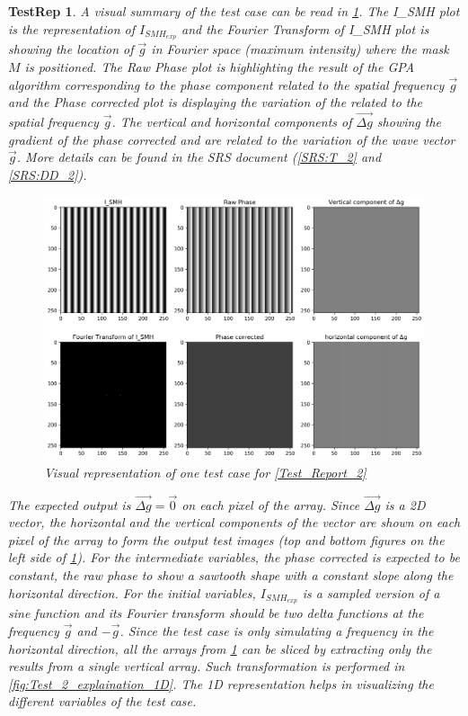 \documentclass[12pt, titlepage]{article}
\newtheorem{TestRep}{TestRep}
\begin{document}
\begin{TestRep}
A visual summary of the test case can be read in \cref{fig:Test_2_explanation}. 
The I{\_}SMH plot is the representation of $I_{SMH_{exp}}$ and the Fourier 
Transform of I{\_}SMH plot is showing the location of $\overrightarrow{g}$ in 
Fourier space (maximum intensity) where the mask $M$ is positioned. The Raw 
Phase plot is highlighting the result of the GPA algorithm corresponding to the 
phase component related to the spatial frequency $\overrightarrow{g}$ and the 
Phase corrected plot is displaying the variation of the related to the spatial 
frequency $\overrightarrow{g}$. The vertical and horizontal components of 
$\overrightarrow{\Delta g}$ showing the gradient of the phase corrected and are 
related to the variation of the wave vector $\overrightarrow{g}$. More details 
can be found in the SRS document (\cref{SRS:T_2} and \cref{SRS:DD_2}).

\begin{figure}[H]
\begin{center}
\includegraphics[scale=0.5]{Figures/Test_2_explanation.png}
\caption{Visual representation of one test case for \cref{Test_Report_2}}
\label{fig:Test_2_explanation}
\end{center}
\end{figure}

The expected output is $\overrightarrow{\Delta g} = \overrightarrow{0}$ on each 
pixel of the array. Since $\overrightarrow{\Delta g}$ is a 2D vector, the 
horizontal and the vertical components of the vector are shown on each pixel of 
the array to form the output test images (top and bottom figures on the left 
side of \cref{fig:Test_2_explanation}). For the intermediate variables, the 
phase corrected is expected to be constant, the raw phase to show a sawtooth 
shape with a constant slope along the horizontal direction. For the initial 
variables, $I_{SMH_{exp}}$ is a sampled version of a sine function and its 
Fourier transform should be two delta functions at the frequency 
$\overrightarrow{g}$ and $-\overrightarrow{g}$. Since the test case is only 
simulating a frequency in the horizontal direction, all the arrays from 
\cref{fig:Test_2_explanation} can be sliced by extracting only the results from 
a single vertical array. Such transformation is performed in 
\cref{fig:Test_2_explaination_1D}. The 1D representation helps in visualizing 
the different variables of the test case. 


\end{TestRep}
\end{document}
